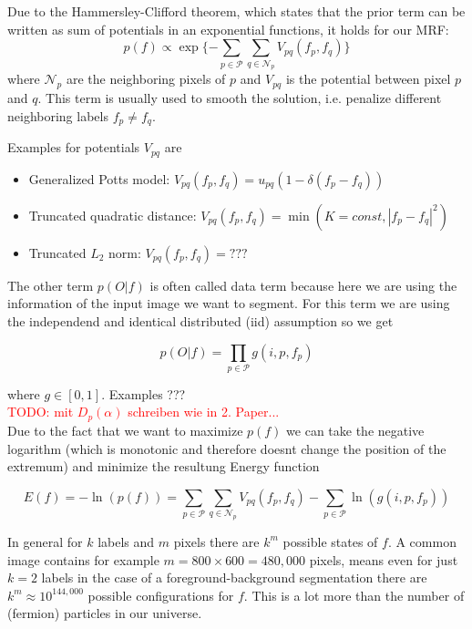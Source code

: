 \documentclass{scrartcl}[12pt, halfparskip]
\newcommand{\todo}[1]{\textcolor{red}{TODO: #1}}
\begin{document}
Due to the Hammersley-Clifford theorem, which states that the prior term can be written as sum of potentials in an exponential functions, it holds for our MRF:
\begin{equation}
	p(f) \propto \exp\{ - \sum\limits_{p \in \mathcal{P}} \sum\limits_{q \in \mathcal{N}_p} V_{pq} (f_p, f_q) \}
\end{equation}
where $\mathcal{N}_p$ are the neighboring pixels of $p$ and $V_{pq}$ is the potential between pixel $p$ and $q$. This term is usually used to smooth the solution, i.e. penalize different neighboring labels $f_p \neq f_q$.

Examples for potentials $V_{pq}$ are
\begin{itemize}
	\item Generalized Potts model: $V_{pq}(f_p, f_q) = u_{pq} (1 - \delta(f_p - f_q))$
	\item Truncated quadratic distance: $V_{pq}(f_p, f_q) = \min (K=const, |f_p - f_q|^2)$
	\item Truncated $L_2$ norm: $V_{pq}(f_p, f_q) = ???$
\end{itemize}

The other term $p(O|f)$ is often called data term because here we are using the information of the input image we want to segment. For this term we are using the independend and identical distributed (iid) assumption so we get

\begin{equation}
	p(O|f) = \prod\limits_{p \in \mathcal{P}} g(i, p, f_p)
\end{equation}

where $g \in [0, 1]$. Examples ??? \\
\todo{mit $D_p(\alpha)$ schreiben wie in 2. Paper...} \\

Due to the fact that we want to maximize $p(f)$ we can take the negative logarithm (which is monotonic and therefore doesnt change the position of the extremum) and minimize the resultung Energy function

\begin{equation}
E(f) = - \ln(p(f)) = \sum\limits_{p \in \mathcal{P}} \sum\limits_{q \in \mathcal{N}_p} V_{pq} (f_p, f_q) - \sum\limits_{p \in \mathcal{P}} \ln(g(i, p, f_p))
\end{equation}
\label{eq:energy-function}

In general for $k$ labels and $m$ pixels there are $k^m$ possible states of $f$. A common image contains for example $m = 800 \times 600 = 480,000$ pixels, means even for just $k = 2$ labels in the case of a foreground-background segmentation there are $k^m \approx 10^{144,000}$ possible configurations for $f$. This is a lot more than the number of (fermion) particles in our universe.
\end{document}
